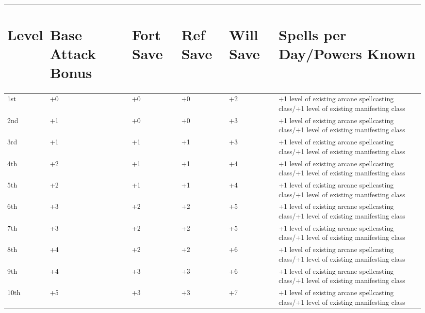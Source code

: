 \documentclass{article}
\begin{document}
\begin{tabular}{|>{\raggedright}p{15pt}|>{\raggedright}p{19pt}|>{\raggedright}p{13pt}|>{\raggedright}p{14pt}|>{\raggedright}p{13pt}|>{\raggedright}p{202pt}|}
\section*{L\textbf{evel}} & \section*{B\textbf{ase Attack Bonus}} & \section*{F\textbf{ort 
Save}} & \section*{R\textbf{ef Save}} & \section*{W\textbf{ill Save}} & \section*{S\textbf{pells 
per Day/Powers Known}}\tabularnewline
\hline
1st & +0 & +0 & +0 & +2 & +1 level of existing arcane spellcasting class/+1 level 
of existing manifesting class\tabularnewline
\hline
2nd & +1 & +0 & +0 & +3 & +1 level of existing arcane spellcasting class/+1 level 
of existing manifesting class\tabularnewline
\hline
3rd & +1 & +1 & +1 & +3 & +1 level of existing arcane spellcasting class/+1 level 
of existing manifesting class\tabularnewline
\hline
4th & +2 & +1 & +1 & +4 & +1 level of existing arcane spellcasting class/+1 level 
of existing manifesting class\tabularnewline
\hline
5th & +2 & +1 & +1 & +4 & +1 level of existing arcane spellcasting class/+1 level 
of existing manifesting class\tabularnewline
\hline
6th & +3 & +2 & +2 & +5 & +1 level of existing arcane spellcasting class/+1 level 
of existing manifesting class\tabularnewline
\hline
7th & +3 & +2 & +2 & +5 & +1 level of existing arcane spellcasting class/+1 level 
of existing manifesting class\tabularnewline
\hline
8th & +4 & +2 & +2 & +6 & +1 level of existing arcane spellcasting class/+1 level 
of existing manifesting class\tabularnewline
\hline
9th & +4 & +3 & +3 & +6 & +1 level of existing arcane spellcasting class/+1 level 
of existing manifesting class\tabularnewline
\hline
10th & +5 & +3 & +3 & +7 & +1 level of existing arcane spellcasting class/+1 level 
of existing manifesting class\tabularnewline
\hline
\end{tabular}
\end{document}
